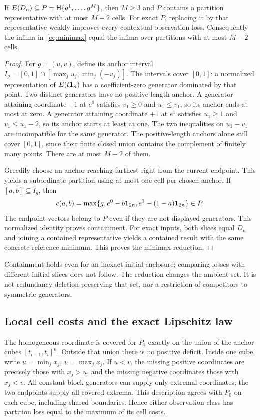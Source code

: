 \begin{theorem}\label{thm:partition}
If $E(D_n)\subseteq P=\mathsf H\{g^1,\ldots,g^M\}$, then $M\ge3$ and $P$ contains a partition representative with at most $M-2$ cells. For exact $P$, replacing it by that representative weakly improves every contextual observation loss. Consequently the infima in~\eqref{eq:minimax} equal the infima over partitions with at most $M-2$ cells.
\end{theorem}
\begin{proof}
For $g=(u,v)$, define its anchor interval
$I_g=[0,1]\cap[\max_j u_j,\min_j(-v_j)]$.
The intervals cover $[0,1]$: a normalized representation of $E(t\mathbf 1_n)$ has a coefficient-zero generator dominated by that point. Two distinct generators have no positive-length anchor. A generator attaining coordinate $-1$ at $e^0$ satisfies $v_1\ge0$ and $u_1\le v_1$, so its anchor ends at most at zero. A generator attaining coordinate $+1$ at $e^1$ satisfies $u_1\ge1$ and $v_1\le u_1-2$, so its anchor starts at least at one. The two inequalities on $u_1-v_1$ are incompatible for the same generator. The positive-length anchors alone still cover $[0,1]$, since their finite closed union contains the complement of finitely many points. There are at most $M-2$ of them.

Greedily choose an anchor reaching farthest right from the current endpoint. This yields a subordinate partition using at most one cell per chosen anchor. If $[a,b]\subseteq I_g$, then
\begin{equation}\label{eq:anchor-containment}
c(a,b)=\max\{g,e^0-b\mathbf 1_{2n},e^1-(1-a)\mathbf 1_{2n}\}\in P.
\end{equation}
The endpoint vectors belong to $P$ even if they are not displayed generators. This normalized identity proves containment. For exact inputs, both slices equal $D_n$ and joining a contained representative yields a contained result with the same concrete reference minimum. This proves the minimax reduction.
\end{proof}

Containment holds even for an inexact initial enclosure; comparing losses with different initial slices does not follow. The reduction changes the ambient set. It is not redundancy deletion preserving that set, nor a restriction of competitors to symmetric generators.

\subsection{Local cell costs and the exact Lipschitz law}
The homogeneous coordinate is covered for $P_{\boldsymbol t}$ exactly on the union of the anchor cubes $[t_{i-1},t_i]^n$. Outside that union there is no positive deficit. Inside one cube, write $u=\min_j x_j$, $v=\max_j x_j$. If $u<v$, the missing positive coordinates are precisely those with $x_j>u$, and the missing negative coordinates those with $x_j<v$. All constant-block generators can supply only extremal coordinates; the two endpoints supply all covered extrema. This description agrees with $P_0$ on each cube, including shared boundaries. Hence either observation class has partition loss equal to the maximum of its cell costs.

